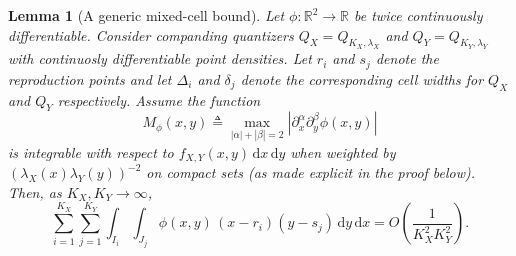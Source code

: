 \documentclass[10pt,a4paper]{amsart}
\newtheorem{lemma}{Lemma}
\newcommand{\R}{\mathbb{R}}
\newcommand{\abs}[1]{\left\lvert #1 \right\rvert}
\newcommand{\dd}{\,\mathrm{d}}
\newcommand{\defeq}{\triangleq}
\begin{document}
\begin{lemma}[A generic mixed-cell bound]\label{lem:mixed_cell_bound}
Let $\phi:\R^2\to\R$ be twice continuously differentiable. Consider companding quantizers $Q_X=Q_{K_X,\lambda_X}$ and $Q_Y=Q_{K_Y,\lambda_Y}$ with continuosly differentiable point densities. Let $r_i$ and $s_j$ denote the reproduction points and let $\Delta_i$ and $\delta_j$ denote the corresponding cell widths for $Q_X$ and $Q_Y$ respectively.
Assume the function
\[
M_\phi(x,y)\defeq \max_{|\alpha|+|\beta|=2}\abs{\partial_x^\alpha\partial_y^\beta \phi(x,y)}
\]
is integrable with respect to $f_{X,Y}(x,y)\dd x\dd y$ when weighted by $(\lambda_X(x)\lambda_Y(y))^{-2}$ on compact sets (as made explicit in the proof below).
Then, as $K_X,K_Y\to\infty$,
\begin{equation}\label{eq:mixed_term_order_template}
\sum_{i=1}^{K_X}\sum_{j=1}^{K_Y}\int_{I_i}\int_{J_j}
\phi(x,y)\,(x-r_i)(y-s_j)\dd y\dd x
=O\!\left(\frac{1}{K_X^2K_Y^2}\right).
\end{equation}
\end{lemma}
\end{document}
